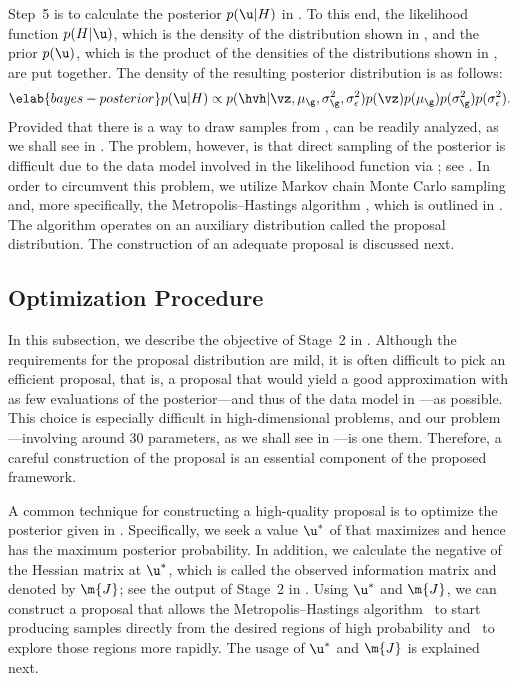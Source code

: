 Step~5 is to calculate the posterior $p(\u | H)$ in . To
this end, the likelihood function $p(H | \u)$, which is the density of the
distribution shown in , and the prior $p(\u)$, which is
the product of the densities of the distributions shown in ,
are put together. The density of the resulting posterior distribution is as
follows:
\begin{equation} \elab{bayes-posterior}
  p(\u | H) \propto p(\hvh | \vz, \mu_\g, \sigma^2_\g, \sigma^2_\epsilon) p(\vz) p(\mu_\g) p(\sigma^2_\g) p(\sigma^2_\epsilon).
\end{equation}
Provided that there is a way to draw samples from , \g can
be readily analyzed, as we shall see in . The problem,
however, is that direct sampling of the posterior is difficult due to the data
model involved in the likelihood function via \vh; see .
In order to circumvent this problem, we utilize Markov chain Monte Carlo
sampling and, more specifically, the Metropolis--Hastings algorithm
\cite{gelman2013}, which is outlined in . The
algorithm operates on an auxiliary distribution called the proposal
distribution. The construction of an adequate proposal is discussed next.

\subsection{Optimization Procedure}

In this subsection, we describe the objective of Stage~2 in
. Although the requirements for the proposal distribution
are mild, it is often difficult to pick an efficient proposal, that is, a
proposal that would yield a good approximation with as few evaluations of the
posterior---and thus of the data model in ---as possible.
This choice is especially difficult in high-dimensional problems, and our
problem---involving around 30 parameters, as we shall see in
---is one them. Therefore, a careful construction of the
proposal is an essential component of the proposed framework.

A common technique for constructing a high-quality proposal is to optimize the
posterior given in . Specifically, we seek a value $\u^*$
of \u that maximizes  and hence has the maximum posterior
probability. In addition, we calculate the negative of the Hessian matrix at
$\u^*$, which is called the observed information matrix and denoted by $\m{J}$;
see the output of Stage~2 in . Using $\u^*$ and $\m{J}$, we
can construct a proposal that allows the Metropolis--Hastings algorithm \one~to
start producing samples directly from the desired regions of high probability
and \two~to explore those regions more rapidly. The usage of $\u^*$ and $\m{J}$
is explained next.

